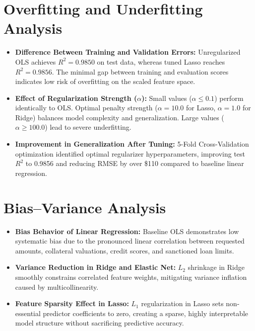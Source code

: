 \documentclass[12pt,a4paper]{article}
\begin{document}
\section{Overfitting and Underfitting Analysis}

\begin{itemize}
    \item \textbf{Difference Between Training and Validation Errors:} Unregularized OLS achieves $R^2 = 0.9850$ on test data, whereas tuned Lasso reaches $R^2 = 0.9856$. The minimal gap between training and evaluation scores indicates low risk of overfitting on the scaled feature space.
    \item \textbf{Effect of Regularization Strength ($\alpha$):} Small values ($\alpha \le 0.1$) perform identically to OLS. Optimal penalty strength ($\alpha = 10.0$ for Lasso, $\alpha = 1.0$ for Ridge) balances model complexity and generalization. Large values ($\alpha \ge 100.0$) lead to severe underfitting.
    \item \textbf{Improvement in Generalization After Tuning:} 5-Fold Cross-Validation optimization identified optimal regularizer hyperparameters, improving test $R^2$ to 0.9856 and reducing RMSE by over \$110 compared to baseline linear regression.
\end{itemize}

\section{Bias--Variance Analysis}

\begin{itemize}
    \item \textbf{Bias Behavior of Linear Regression:} Baseline OLS demonstrates low systematic bias due to the pronounced linear correlation between requested amounts, collateral valuations, credit scores, and sanctioned loan limits.
    \item \textbf{Variance Reduction in Ridge and Elastic Net:} $L_2$ shrinkage in Ridge smoothly constrains correlated feature weights, mitigating variance inflation caused by multicollinearity.
    \item \textbf{Feature Sparsity Effect in Lasso:} $L_1$ regularization in Lasso sets non-essential predictor coefficients to zero, creating a sparse, highly interpretable model structure without sacrificing predictive accuracy.
\end{itemize}
\end{document}
